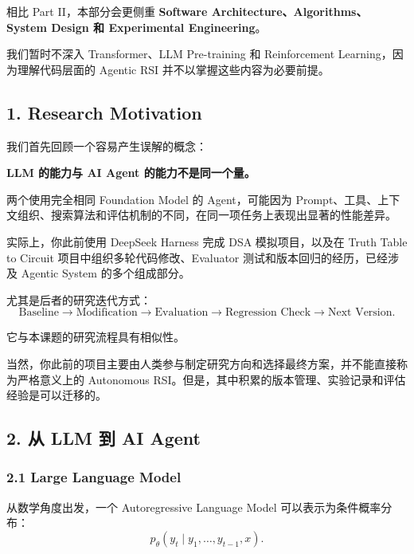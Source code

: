 相比 Part II，本部分会更侧重 \textbf{Software Architecture、Algorithms、System Design 和 Experimental Engineering}。

我们暂时不深入 Transformer、LLM Pre-training 和 Reinforcement Learning，因为理解代码层面的 Agentic RSI 并不以掌握这些内容为必要前提。

\hypertarget{part-3-31-0001-research-motivation}{%
\subsection{1. Research Motivation}\label{part-3-31-0001-research-motivation}}

我们首先回顾一个容易产生误解的概念：

\textbf{LLM 的能力与 AI Agent 的能力不是同一个量。}

两个使用完全相同 Foundation Model 的 Agent，可能因为 Prompt、工具、上下文组织、搜索算法和评估机制的不同，在同一项任务上表现出显著的性能差异。


实际上，你此前使用 DeepSeek Harness 完成 DSA 模拟项目，以及在 Truth Table to Circuit 项目中组织多轮代码修改、Evaluator 测试和版本回归的经历，已经涉及 Agentic System 的多个组成部分。

尤其是后者的研究迭代方式：
\[\text{Baseline}
\rightarrow
\text{Modification}
\rightarrow
\text{Evaluation}
\rightarrow
\text{Regression Check}
\rightarrow
\text{Next Version}.\]

它与本课题的研究流程具有相似性。

当然，你此前的项目主要由人类参与制定研究方向和选择最终方案，并不能直接称为严格意义上的 Autonomous RSI。但是，其中积累的版本管理、实验记录和评估经验是可以迁移的。

\hypertarget{part-3-31-0001-ux4ece-llm-ux5230-ai-agent}{%
\subsection{2. 从 LLM 到 AI Agent}\label{part-3-31-0001-ux4ece-llm-ux5230-ai-agent}}

\hypertarget{part-3-31-0001-large-language-model}{%
\subsubsection{2.1 Large Language Model}\label{part-3-31-0001-large-language-model}}

从数学角度出发，一个 Autoregressive Language Model 可以表示为条件概率分布：
\[p_\theta(y_t\mid y_1,\ldots,y_{t-1},x).\]

